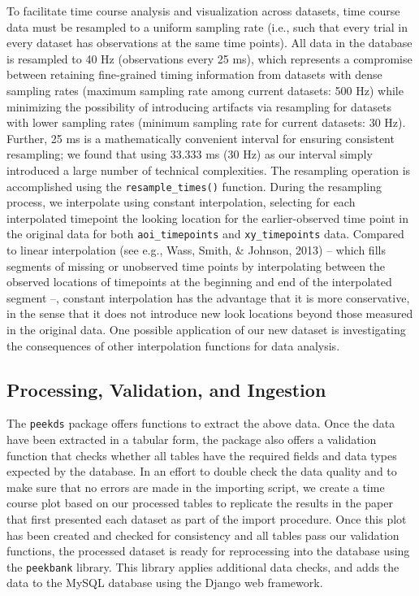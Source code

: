 \documentclass[
  english,
  man,floatsintext]{apa6}
\begin{document}
To facilitate time course analysis and visualization across datasets, time course data must be resampled to a uniform sampling rate (i.e., such that every trial in every dataset has observations at the same time points).
All data in the database is resampled to 40 Hz (observations every 25 ms), which represents a compromise between retaining fine-grained timing information from datasets with dense sampling rates (maximum sampling rate among current datasets: 500 Hz) while minimizing the possibility of introducing artifacts via resampling for datasets with lower sampling rates (minimum sampling rate for current datasets: 30 Hz).
Further, 25 ms is a mathematically convenient interval for ensuring consistent resampling; we found that using 33.333 ms (30 Hz) as our interval simply introduced a large number of technical complexities.
The resampling operation is accomplished using the \texttt{resample\_times()} function.
During the resampling process, we interpolate using constant interpolation, selecting for each interpolated timepoint the looking location for the earlier-observed time point in the original data for both \texttt{aoi\_timepoints} and \texttt{xy\_timepoints} data.
Compared to linear interpolation (see e.g., Wass, Smith, \& Johnson, 2013) -- which fills segments of missing or unobserved time points by interpolating between the observed locations of timepoints at the beginning and end of the interpolated segment --, constant interpolation has the advantage that it is more conservative, in the sense that it does not introduce new look locations beyond those measured in the original data.
One possible application of our new dataset is investigating the consequences of other interpolation functions for data analysis.

\hypertarget{processing-validation-and-ingestion}{%
\subsection{Processing, Validation, and Ingestion}\label{processing-validation-and-ingestion}}

The \texttt{peekds} package offers functions to extract the above data.
Once the data have been extracted in a tabular form, the package also offers a validation function that checks whether all tables have the required fields and data types expected by the database.
In an effort to double check the data quality and to make sure that no errors are made in the importing script, we create a time course plot based on our processed tables to replicate the results in the paper that first presented each dataset as part of the import procedure.
Once this plot has been created and checked for consistency and all tables pass our validation functions, the processed dataset is ready for reprocessing into the database using the \texttt{peekbank} library.
This library applies additional data checks, and adds the data to the MySQL database using the Django web framework.
\end{document}
